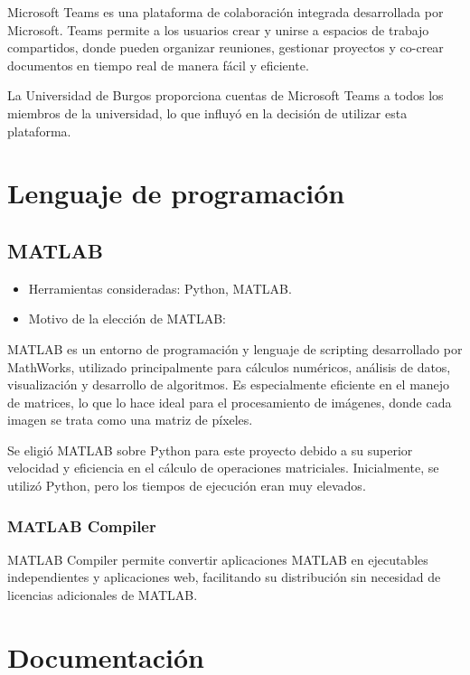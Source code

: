 Microsoft Teams es una plataforma de colaboración integrada desarrollada por Microsoft. Teams permite a los usuarios crear y unirse a espacios de trabajo compartidos, donde pueden organizar reuniones, gestionar proyectos y co-crear documentos en tiempo real de manera fácil y eficiente.

La Universidad de Burgos proporciona cuentas de Microsoft Teams a todos los miembros de la universidad, lo que influyó en la decisión de utilizar esta plataforma.

\section{Lenguaje de programación}\label{lenguaje-de-programación}

\subsection{MATLAB}\label{matlab}

\begin{itemize}
    \item Herramientas consideradas: Python, MATLAB.
    \item Motivo de la elección de MATLAB:
\end{itemize}

MATLAB es un entorno de programación y lenguaje de scripting desarrollado por MathWorks, utilizado principalmente para cálculos numéricos, análisis de datos, visualización y desarrollo de algoritmos. Es especialmente eficiente en el manejo de matrices, lo que lo hace ideal para el procesamiento de imágenes, donde cada imagen se trata como una matriz de píxeles.

Se eligió MATLAB sobre Python para este proyecto debido a su superior velocidad y eficiencia en el cálculo de operaciones matriciales. Inicialmente, se utilizó Python, pero los tiempos de ejecución eran muy elevados.

\subsubsection{MATLAB Compiler}\label{matlab-compiler}

MATLAB Compiler \cite{matlabRuntime} permite convertir aplicaciones MATLAB en ejecutables independientes y aplicaciones web, facilitando su distribución sin necesidad de licencias adicionales de MATLAB. 

\section{Documentación}\label{documentación}

